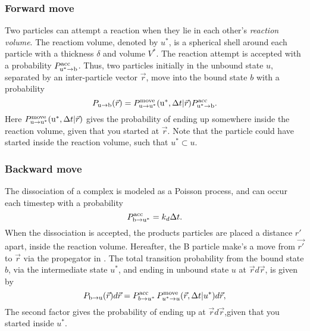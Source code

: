 \subsubsection{Forward move}
Two particles can attempt a reaction when they lie in each other's {\it reaction volume}. The reactiom volume, denoted by $u^*$, is a spherical shell around each particle with a thickness $\delta$ and volume $V^*$. The reaction attempt is accepted with a probability $P^{\rm acc}_{{\rm u}^* \to {\rm b}}$. Thus, two particles initially in the unbound state $u$, separated by an inter-particle vector $\vec{r}$, move into the bound state $b$ with a probability
\begin{equation}
P_{ \rm{u} \to \rm{b} }(\vec{r}) = P^{\rm move}_{{\rm u} \to {\rm u}^*}({\rm u}^*,\Delta t|\vec{r}) P^{\rm acc}_{{\rm u}^* \to {\rm b}}.
\end{equation}
Here $P^{\rm move}_{{\rm u} \to {\rm u}^*}({\rm u}^*,\Delta t|\vec{r})$ gives the probability of ending up somewhere inside the reaction volume, given that you started at $\vec{r}$. Note that the particle could have started inside the reaction volume, such that $u^* \subset u$.

\subsubsection{Backward move}
The dissociation of a complex is modeled as a Poisson process, and can occur each timestep with a probability
\begin{equation}
 P^{\rm acc}_{\rm b \to u^*} = k_d \Delta t.
\end{equation}
When the dissociation is accepted, the products particles are placed a distance $r'$ apart, inside the reaction volume. Hereafter, the B particle make's a move from $\vec{r'}$ to $\vec{r}$ via the propegator in . The total transition probability from the bound state $b$, via the intermediate state $u^*$, and ending in unbound state $u$ at $\vec{r}d\vec{r}$, is given by
\begin{equation}
P_{ \rm{b} \to \rm{u}}(\vec{r})d\vec{r} =  P^{\rm acc}_{b \to u^*}\,P^{\rm move}_{u^* \to u}(\vec{r},\Delta t|u^*)d\vec{r},
\end{equation}
The second factor gives the probability of ending up at $\vec{r}d\vec{r}$,given that you started inside $u^*$.

